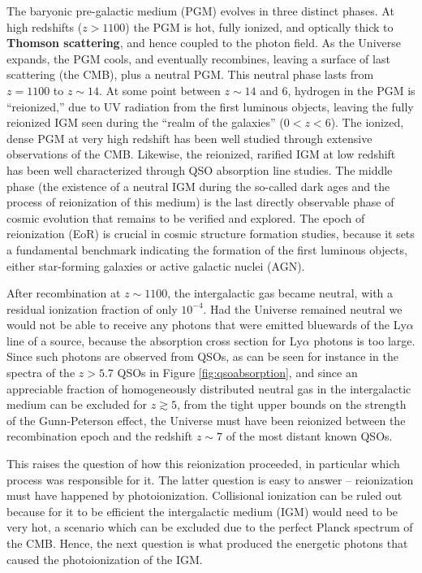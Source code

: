 \documentclass[a4paper,11pt]{article}
\begin{document}
{\noindent}The baryonic pre-galactic medium (PGM) evolves in three distinct phases. At high redshifts ($z>1100$) the PGM is hot, fully ionized, and optically thick to \textbf{Thomson scattering}, and hence coupled to the photon field. As the Universe expands, the PGM cools, and eventually recombines, leaving a surface of last scattering (the CMB), plus a neutral PGM. This neutral phase lasts from $z=1100$ to $z\sim14$. At some point between $z\sim14$ and $6$, hydrogen in the PGM is ``reionized,'' due to UV radiation from the first luminous objects, leaving the fully reionized IGM seen during the ``realm of the galaxies'' ($0<z<6$). The ionized, dense PGM at very high redshift has been well studied through extensive observations of the CMB. Likewise, the reionized, rarified IGM at low redshift has been well characterized through QSO absorption line studies. The middle phase (the existence of a neutral IGM during the so-called dark ages and the process of reionization of this medium) is the last directly observable phase of cosmic evolution that remains to be verified and explored. The epoch of reionization (EoR) is crucial in cosmic structure formation studies, because it sets a fundamental benchmark indicating the formation of the first luminous objects, either star-forming galaxies or active galactic nuclei (AGN).

{\noindent}After recombination at $z\sim1100$, the intergalactic gas became neutral, with a residual ionization fraction of only $10^{-4}$. Had the Universe remained neutral we would not be able to receive any photons that were emitted bluewards of the Ly$\alpha$ line of a source, because the absorption cross section for Ly$\alpha$ photons is too large. Since such photons are observed from QSOs, as can be seen for instance in the spectra of the $z>5.7$ QSOs in Figure \ref{fig:qsoabsorption}, and since an appreciable fraction of homogeneously distributed neutral gas in the intergalactic medium can be excluded for $z\gtrsim5$, from the tight upper bounds on the strength of the Gunn-Peterson effect, the Universe must have been reionized between the recombination epoch and the redshift $z\sim7$ of the most distant known QSOs.

{\noindent}This raises the question of how this reionization proceeded, in particular which process was responsible for it. The latter question is easy to answer -- reionization must have happened by photoionization. Collisional ionization can be ruled out because for it to be efficient the intergalactic medium (IGM) would need to be very hot, a scenario which can be excluded due to the perfect Planck spectrum of the CMB. Hence, the next question is what produced the energetic photons that caused the photoionization of the IGM.
\end{document}

